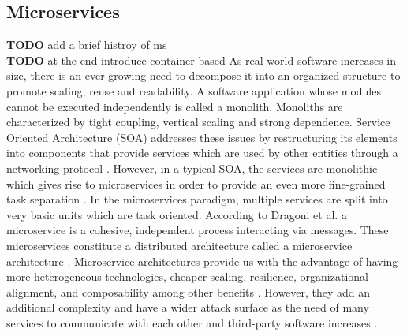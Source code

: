 \subsection{Microservices}
\label{chap:microservices}

\textbf{TODO} add a brief histroy of ms\\
\textbf{TODO} at the end introduce container based 
As real-world software increases in size, there is an ever growing need to decompose it into an organized structure to promote scaling, reuse and readability. A software application whose modules cannot be executed independently is called a monolith. Monoliths are characterized by tight coupling, vertical scaling and strong dependence. Service Oriented Architecture (SOA) addresses these issues by restructuring its elements into components that provide services which are used by other entities through a networking protocol \cite{papazoglou2003service}. However, in a typical SOA, the services are monolithic which gives rise to microservices in order to provide an even more fine-grained task separation \cite{ahmadvand2016requirements}.
In the microservices paradigm, multiple services are split into very basic units which are task oriented. According to Dragoni et al. a microservice is a cohesive, independent process interacting via messages. These microservices constitute a distributed architecture called a microservice architecture \cite{dragoni2017microservices}. Microservice architectures provide us with the advantage of having more heterogeneous technologies, cheaper scaling, resilience, organizational alignment, and composability among other benefits \cite{newman2015building}. However, they add an additional complexity and have a wider attack surface as the need of many services to communicate with each other and third-party software increases \cite{combe2016docker, dragoni2017microservices}. 

